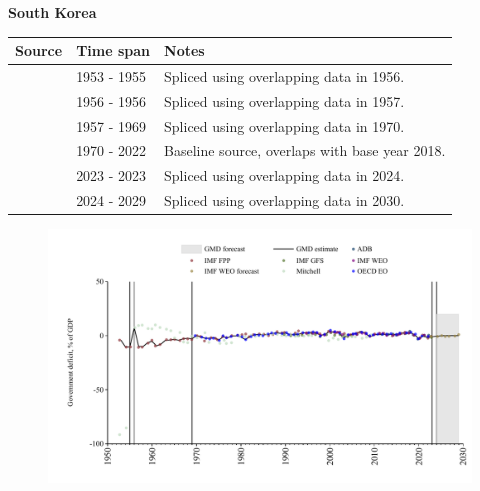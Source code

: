 \documentclass[12pt,a4paper,landscape]{article}
\begin{document}
\begin{adjustbox}{max totalsize={\paperwidth}{\paperheight},center}
\begin{minipage}[t][\textheight][t]{\textwidth}
\vspace*{0.5cm}
{}
\begin{center}
{\Large\bfseries South Korea}
\end{center}
\vspace{0.5cm}
\begin{table}[H]
\centering
\small
\begin{tabular}{|l|l|l|}
\hline
\textbf{Source} & \textbf{Time span} & \textbf{Notes} \\
\hline
\rowcolor{white}\cite{IMF_FPP}& 1953 - 1955 &Spliced using overlapping data in 1956.\\
\rowcolor{lightgray}\cite{Mitchell}& 1956 - 1956 &Spliced using overlapping data in 1957.\\
\rowcolor{white}\cite{IMF_FPP}& 1957 - 1969 &Spliced using overlapping data in 1970.\\
\rowcolor{lightgray}\cite{OECD_EO}& 1970 - 2022 &Baseline source, overlaps with base year 2018.\\
\rowcolor{white}\cite{IMF_GFS}& 2023 - 2023 &Spliced using overlapping data in 2024.\\
\rowcolor{lightgray}\cite{IMF_WEO_forecast}& 2024 - 2029 &Spliced using overlapping data in 2030.\\
\hline
\end{tabular}
\end{table}
\begin{figure}[H]
\centering
\includegraphics[width=\textwidth,height=0.6\textheight,keepaspectratio]{graphs/KOR_govdef_GDP.pdf}
\end{figure}
\end{minipage}
\end{adjustbox}
\end{document}
